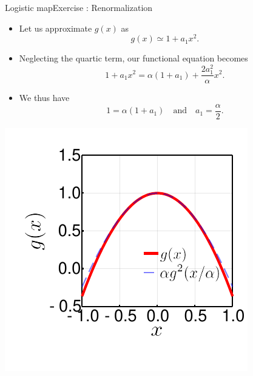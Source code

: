 \documentclass[usenames,dvipsnames,svgnames,10pt,aspectratio=169]{beamer}
\begin{document}
\begin{frame}[t, c]{Logistic map}{Exercise : Renormalization}
	\begin{minipage}{.68\textwidth}
		\begin{itemize}
			\item Let us approximate \(g(x)\) as
			\[
				g(x) \simeq 1 + a_1 x^2.
			\]

			\medskip

			\item Neglecting the quartic term, our functional equation becomes
			\[
				1 + a_1 x^2 = \alpha ( 1 + a_1 ) + \frac{2 a_1^2 }{\alpha} x^2.
			\]

			\medskip

			\item We thus have
			\[
				1 = \alpha ( 1 + a_1 ) \quad \text{and} \quad a_1 = \frac{\alpha}{2}.
			\]
		\end{itemize}
	\end{minipage}%
	\hfill
	\begin{minipage}{.28\textwidth}
		\centering
		\includegraphics[width=\textwidth]{quadratic_functional_equation}
	\end{minipage}

	\vspace{1cm}
\end{frame}
\end{document}
